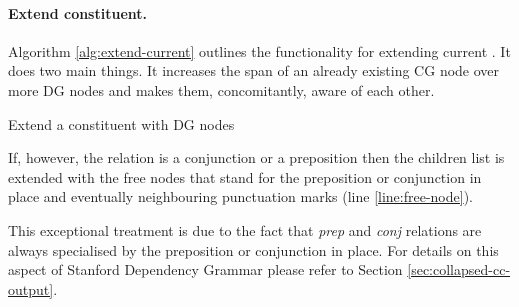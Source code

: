 \paragraph{Extend constituent.} Algorithm \ref{alg:extend-current} outlines the functionality for extending current \cgPointer. It does two main things. It increases the span of an already existing CG node over more DG nodes and makes them, concomitantly, aware of each other. 

\begin{algorithm}[!ht]
\Input { \cgPointer, \Children, \elementType, \edge, \dg, \cg}
	\caption{Extend a constituent with DG nodes}
	\label{alg:extend-current}
\end{algorithm}

If, however, the \edge relation is a conjunction or a preposition then the children list is extended with the free nodes that stand for the preposition or conjunction in place and eventually neighbouring punctuation marks (line \ref{line:free-node}). %

This exceptional treatment is due to the fact that \textit{prep} and \textit{conj} relations are always specialised by the preposition or conjunction in place. For details on this aspect of Stanford Dependency Grammar please refer to Section \ref{sec:collapsed-cc-output}.

